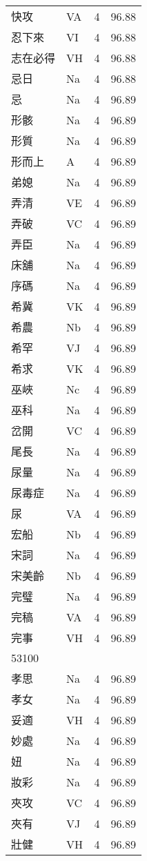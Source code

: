 \documentclass[twocolumn]{book}
\begin{document}
\begin{supertabular}{llrr}
快攻 & VA & 4 &  96.88\\
忍下來 & VI & 4 &  96.88\\
志在必得 & VH & 4 &  96.88\\
忌日 & Na & 4 &  96.88\\
忌 & Na & 4 &  96.89\\
形骸 & Na & 4 &  96.89\\
形質 & Na & 4 &  96.89\\
形而上 & A & 4 &  96.89\\
弟媳 & Na & 4 &  96.89\\
弄清 & VE & 4 &  96.89\\
弄破 & VC & 4 &  96.89\\
弄臣 & Na & 4 &  96.89\\
床舖 & Na & 4 &  96.89\\
序碼 & Na & 4 &  96.89\\
希冀 & VK & 4 &  96.89\\
希農 & Nb & 4 &  96.89\\
希罕 & VJ & 4 &  96.89\\
希求 & VK & 4 &  96.89\\
巫峽 & Nc & 4 &  96.89\\
巫科 & Na & 4 &  96.89\\
岔開 & VC & 4 &  96.89\\
尾長 & Na & 4 &  96.89\\
尿量 & Na & 4 &  96.89\\
尿毒症 & Na & 4 &  96.89\\
尿 & VA & 4 &  96.89\\
宏船 & Nb & 4 &  96.89\\
宋詞 & Na & 4 &  96.89\\
宋美齡 & Nb & 4 &  96.89\\
完璧 & Na & 4 &  96.89\\
完稿 & VA & 4 &  96.89\\
完事 & VH & 4 &  96.89\\
53100\\
孝思 & Na & 4 &  96.89\\
孝女 & Na & 4 &  96.89\\
妥適 & VH & 4 &  96.89\\
妙處 & Na & 4 &  96.89\\
妞 & Na & 4 &  96.89\\
妝彩 & Na & 4 &  96.89\\
夾攻 & VC & 4 &  96.89\\
夾有 & VJ & 4 &  96.89\\
壯健 & VH & 4 &  96.89\\

\end{supertabular}
\end{document}
